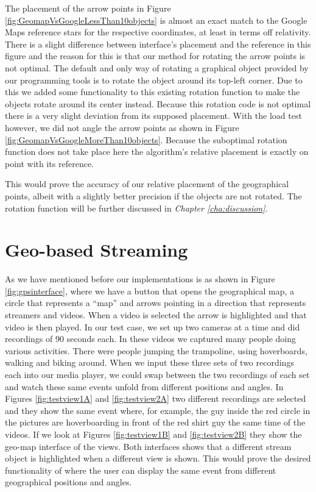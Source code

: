 The placement of the arrow points in Figure \ref{fig:GeomapVsGoogleLessThan10objects} is almost an exact match to the Google Maps reference stars for the respective coordinates, at least in terms off relativity. There is a slight difference between interface's placement and the reference in this figure and the reason for this is that our method for rotating the arrow points is not optimal. The default and only way of rotating a graphical object provided by our programming tools is to rotate the object around its top-left corner. Due to this we added some functionality to this existing rotation function to make the objects rotate around its center instead. Because this rotation code is not optimal there is a very slight deviation from its supposed placement. With the load test however, we did not angle the arrow points as shown in Figure \ref{fig:GeomapVsGoogleMoreThan10objects}. Because the suboptimal rotation function does not take place here the algorithm's relative placement is exactly on point with its reference.

This would prove the accuracy of our relative placement of the geographical points, albeit with a slightly better precision if the objects are not rotated. The rotation function will be further discussed in \textit{Chapter \ref{cha:discussion}}.

\section{Geo-based Streaming}
\label{sec:geobasedstreaming}

As we have mentioned before our implementations is as shown in Figure \ref{fig:gpsinterface}, where we have a button that opens the geographical map, a circle that represents a “map” and arrows pointing in a direction that represents streamers and videos. When a video is selected the arrow is highlighted and that video is then played. In our test case, we set up two cameras at a time and did recordings of 90 seconds each. In these videos we captured many people doing various activities. There were people jumping the trampoline, using hoverboards, walking and biking around. When we input these three sets of two recordings each into our media player, we could swap between the two recordings of each set and watch these same events unfold from different positions and angles. In Figures \ref{fig:testview1A} and \ref{fig:testview2A} two different recordings are selected and they show the same event where, for example, the guy inside the red circle in the pictures are hoverboarding in front of the red shirt guy the same time of the videos. If we look at Figures \ref{fig:testview1B} and \ref{fig:testview2B} they show the geo-map interface of the views. Both interfaces shows that a different stream object is highlighted when a different view is shown. This would prove the desired functionality of where the user can display the same event from different geographical positions and angles.


